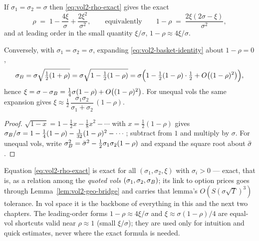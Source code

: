 \begin{corollary}
\label{cor:vol2-equal-vol}
If $\sigma_1 = \sigma_2 = \sigma$ then \eqref{eq:vol2-rho-exact} gives the
exact
\begin{equation}
\rho \;=\; 1 - \frac{4\xi}{\sigma} + \frac{2\xi^2}{\sigma^2},
\qquad\text{equivalently}\qquad
1 - \rho \;=\; \frac{2\xi(2\sigma - \xi)}{\sigma^2},
\label{eq:vol2-rho-equal}
\end{equation}
and at leading order in the small quantity $\xi/\sigma$,
$1 - \rho \approx 4\xi/\sigma$.
\end{corollary}

\begin{theorem}
\label{thm:vol2-first-order-xi}
Conversely, with $\sigma_1 = \sigma_2 = \sigma$, expanding
\eqref{eq:vol2-basket-identity} about $1 - \rho = 0$,
\begin{equation}
\sigma_B = \sigma\sqrt{\tfrac12(1+\rho)}
    = \sigma\sqrt{1 - \tfrac12(1-\rho)}
    = \sigma\Bigl(1 - \tfrac12(1-\rho)\cdot\tfrac12 + O\!\left((1-\rho)^2\right)\Bigr),
\label{eq:vol2-sB-expansion}
\end{equation}
hence
$\xi = \sigma - \sigma_B = \tfrac14\sigma(1-\rho) + O\!\left((1-\rho)^2\right)$.
For unequal vols the same expansion gives
$\xi \approx \tfrac12\,\dfrac{\sigma_1\sigma_2}{\sigma_1+\sigma_2}\,(1-\rho)$.
\end{theorem}

\begin{proof}
$\sqrt{1-x} = 1 - \tfrac12 x - \tfrac18 x^2 - \cdots$ with
$x = \tfrac12(1-\rho)$ gives
$\sigma_B/\sigma = 1 - \tfrac14(1-\rho) - \tfrac1{32}(1-\rho)^2 - \cdots$;
subtract from $1$ and multiply by $\sigma$. For unequal vols, write
$\sigma_B^2 = \bar\sigma^2 - \tfrac12\sigma_1\sigma_2(1-\rho)$ and expand the
square root about $\bar\sigma$.
\end{proof}

\begin{remark}[Validity]
\label{rem:vol2-validity}
Equation \eqref{eq:vol2-rho-exact} is exact for all
$(\sigma_1,\sigma_2,\xi)$ with $\sigma_i > 0$ --- exact, that is, as a
relation among the \emph{quoted vols} $(\sigma_1, \sigma_2, \sigma_B)$; its link
to option prices goes through Lemma~\ref{lem:vol2-geo-bridge} and carries
that lemma's $O(S(\sigma\sqrt{T})^3)$ tolerance. In vol space it is the
backbone of everything in this and the next two chapters. The leading-order forms
$1-\rho \approx 4\xi/\sigma$ and $\xi \approx \sigma(1-\rho)/4$ are
equal-vol shortcuts valid near $\rho \approx 1$ (small $\xi/\sigma$); they
are used only for intuition and quick estimates, never where the exact
formula is needed.
\end{remark}

